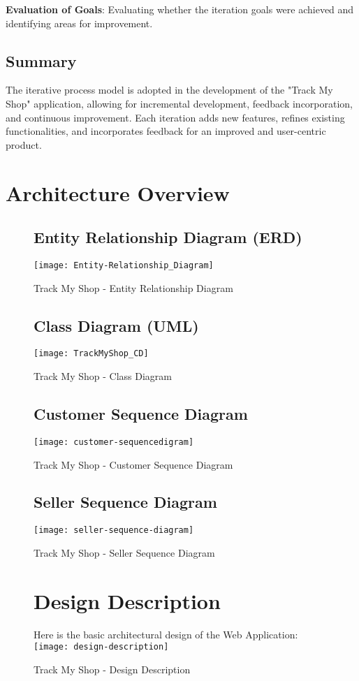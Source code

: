 \textbf{Evaluation of Goals}:
Evaluating whether the iteration goals were achieved and identifying areas for improvement.

\subsection{Summary}

The iterative process model is adopted in the development of the "Track My Shop" application, allowing for incremental development, feedback incorporation, and continuous improvement. Each iteration adds new features, refines existing functionalities, and incorporates feedback for an improved and user-centric product.






\section{Architecture Overview}


\begin{figure}[h]
	\subsection{Entity Relationship Diagram (ERD) }
	\centering
	\texttt{[image: Entity-Relationship\_Diagram]}
	\caption{Track My Shop - Entity Relationship Diagram}
\end{figure}

\pagebreak
\begin{figure}[h]
	\subsection{Class Diagram (UML) }
	\centering
	\texttt{[image: TrackMyShop\_CD]}
	\caption{Track My Shop - Class Diagram}
\end{figure}

\pagebreak
\begin{figure}[h]
	\subsection{Customer Sequence Diagram }
	\centering
	\texttt{[image: customer-sequencedigram]}
	\caption{Track My Shop - Customer Sequence Diagram}
\end{figure}

\pagebreak
\begin{figure}[h]
	\subsection{Seller Sequence Diagram}
	\centering
	\texttt{[image: seller-sequence-diagram]}
	\caption{Track My Shop - Seller Sequence Diagram}
\end{figure}


\pagebreak

\begin{figure}[h]
	\section{Design Description}
	Here is the basic architectural design of the Web Application:\\
	\centering
	\texttt{[image: design-description]}
	\caption{Track My Shop - Design Description}
\end{figure}
\pagebreak


